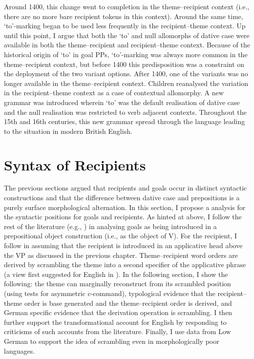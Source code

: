 Around 1400, this change went to completion in the theme--recipient context (i.e., there are no more bare recipient tokens in this context). Around the same time, `to'-marking began to be used less frequently in the recipient--theme context. Up until this point, I argue that both the `to' and null allomorphs of dative case were available in both the theme--recipient and recipient--theme context. Because of the historical origin of `to' in goal PPs, `to'-marking was always more common in the theme--recipient context, but before 1400 this predisposition was a constraint on the deployment of the two variant options. After 1400, one of the variants was no longer available in the theme--recipient context. Children reanalysed the variation in the recipient--theme context as a case of contextual allomorphy. A new grammar was introduced wherein `to' was the default realisation of dative case and the null realisation was restricted to verb adjacent contexts. Throughout the 15th and 16th centuries, this new grammar spread through the language leading to the situation in modern British English.

\section{Syntax of Recipients}\label{sec:synrecp}
The previous sections argued that recipients and goals occur in distinct syntactic constructions and that the difference between dative case and prepositions is a purely surface morphological alternation. In this section, I propose a analysis for the syntactic positions for goals and recipients. As hinted at above, I follow the rest of the literature (e.g., \citet{Jackendoff.1990,Harley.2002,Hallman.2015}) in analysing goals as being introduced in a prepositional object construction (i.e., as the object of V). For the recipient, I follow \cite{McGinnis.1998,Bruening.2010,Bruening.2010b} in assuming that the recipient is introduced in an applicative head above the VP as discussed in the previous chapter. Theme--recipient word orders are derived by scrambling the theme into a second specifier of the applicative phrase (a view first suggested for English in \citet{Takano.1998}). In the following section, I show the following: the theme can marginally reconstruct from its scrambled position (using tests for asymmetric c-command), typological evidence that the recipient--theme order is base generated and the theme--recipient order is derived, and German specific evidence that the derivation operation is scrambling. I then further support the transformational account for English by responding to criticisms of such accounts from the literature. Finally, I use data from Low German to support the idea of scrambling even in morphologically poor languages. 

